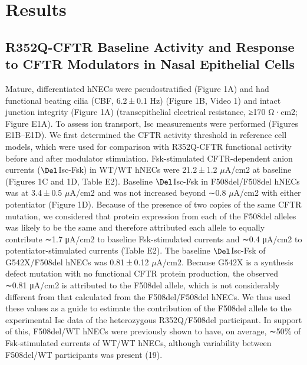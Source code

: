 \section{Results}
\subsection{R352Q-CFTR Baseline Activity and Response to CFTR Modulators in Nasal Epithelial Cells}
Mature, differentiated hNECs were pseudostratified (Figure 1A) and had functional beating cilia (CBF, 6.2 ± 0.1 Hz) (Figure 1B, Video 1) and intact junction integrity (Figure 1A) (transepithelial electrical resistance, ≥170 Ω·cm2; Figure E1A). To assess ion transport, Isc measurements were performed (Figures E1B–E1D). We first determined the CFTR activity threshold in reference cell models, which were used for comparison with R352Q-CFTR functional activity before and after modulator stimulation. Fsk-stimulated CFTR-dependent anion currents ($\Del$Isc-Fsk) in WT/WT hNECs were 21.2 ± 1.2 $\mu$A/cm2 at baseline (Figures 1C and 1D, Table E2). Baseline $\Del$Isc-Fsk in F508del/F508del hNECs was at 3.4 ± 0.5 $\mu$A/cm2 and was not increased beyond ∼0.8 $\mu$A/cm2 with either potentiator (Figure 1D). Because of the presence of two copies of the same CFTR mutation, we considered that protein expression from each of the F508del alleles was likely to be the same and therefore attributed each allele to equally contribute ∼1.7 μA/cm2 to baseline Fsk-stimulated currents and ∼0.4 μA/cm2 to potentiator-stimulated currents (Table E2). The baseline $\Del$Isc-Fsk of G542X/F508del hNECs was 0.81 ± 0.12 $\mu$A/cm2. Because G542X is a synthesis defect mutation with no functional CFTR protein production, the observed ∼0.81 μA/cm2 is attributed to the F508del allele, which is not considerably different from that calculated from the F508del/F508del hNECs. We thus used these values as a guide to estimate the contribution of the F508del allele to the experimental Isc data of the heterozygous R352Q/F508del participant. In support of this, F508del/WT hNECs were previously shown to have, on average, ∼50\% of Fsk-stimulated currents of WT/WT hNECs, although variability between F508del/WT participants was present (19).

